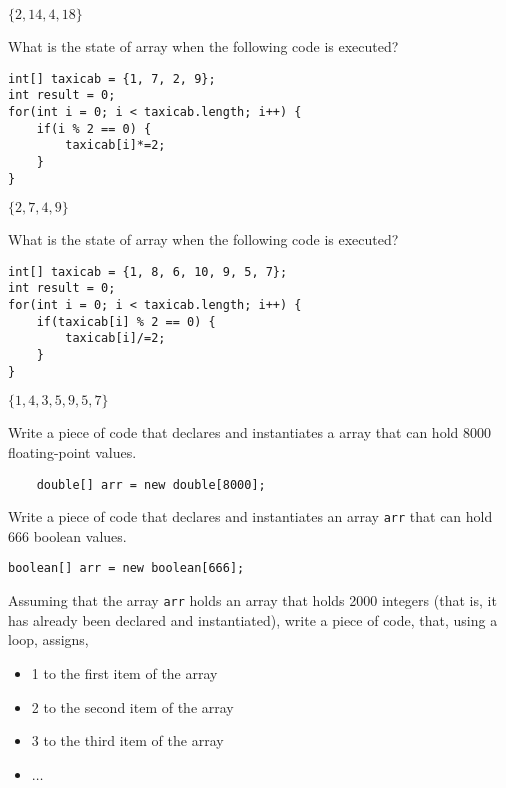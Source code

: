 \begin{questions}
\begin{solution}
$\{2, 14, 4, 18\}$	
\end{solution}

\question What is the state of array  when the following code is executed?

\begin{lstlisting}[basicstyle=\large]
int[] taxicab = {1, 7, 2, 9};
int result = 0;
for(int i = 0; i < taxicab.length; i++) {
	if(i % 2 == 0) {
		taxicab[i]*=2;
	}
}
\end{lstlisting}
$\{2, 7, 4, 9\}$	
\begin{solution}
	
\end{solution}

\question What is the state of array  when the following code is executed?

\begin{lstlisting}[basicstyle=\large]
int[] taxicab = {1, 8, 6, 10, 9, 5, 7};
int result = 0;
for(int i = 0; i < taxicab.length; i++) {
	if(taxicab[i] % 2 == 0) {
		taxicab[i]/=2;
	}
}
\end{lstlisting}

\begin{solution}
$\{1, 4, 3, 5, 9, 5, 7\}$	
\end{solution}

\question Write a piece of code that declares and instantiates a array that can hold 8000 floating-point values.

\begin{solution}
\begin{lstlisting}
	double[] arr = new double[8000];
\end{lstlisting}
\end{solution}

\question Write a piece of code that declares and instantiates an array \texttt{arr} that can hold 666 boolean values.

\begin{solution}
\begin{lstlisting}
boolean[] arr = new boolean[666];
\end{lstlisting}
\end{solution}

\question Assuming that the array \texttt{arr} holds an array that holds 2000 integers (that is, it has already been declared and instantiated), write a piece of code, that, using a loop, assigns,

	\begin{itemize}
	\item 1 to the first item of the array
	\item 2 to the second item of the array
	\item 3 to the third item of the array
	\item $\ldots$
	\end{itemize}
	

\end{questions}
